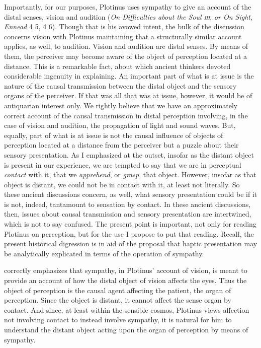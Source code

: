 Importantly, for our purposes, Plotinus uses sympathy to give an account of the distal senses, vision and audition (\emph{On Difficulties about the Soul \textsc{iii}}, \emph{or On Sight}, \emph{Ennead} 4 5, 4 6). Though that is his avowed intent, the bulk of the discussion concerns vision with Plotinus maintaining that a structurally similar account applies, as well, to audition. Vision and audition are distal senses. By means of them, the perceiver may become aware of the object of perception located at a distance. This is a remarkable fact, about which ancient thinkers devoted considerable ingenuity in explaining. An important part of what is at issue is the nature of the causal transmission between the distal object and the sensory organs of the perceiver. If that was all that was at issue, however, it would be of antiquarian interest only. We rightly believe that we have an approximately correct account of the causal transmission in distal perception involving, in the case of vision and audition, the propagation of light and sound waves. But, equally, part of what is at issue is not the causal influence of objects of perception located at a distance from the perceiver but a puzzle about their sensory presentation. As I emphasized at the outset, insofar as the distant object is present in our experience, we are tempted to say that we are in perceptual \emph{contact} with it, that we \emph{apprehend}, or \emph{grasp}, that object. However, insofar as that object is distant, we could not be in contact with it, at least not literally. So these ancient discussions concern, as well, what sensory presentation could be if it is not, indeed, tantamount to sensation by contact. In these ancient discussions, then, issues about causal transmission and sensory presentation are intertwined, which is not to say confused. The present point is important, not only for reading Plotinus on perception, but for the use I propose to put that reading. Recall, the present historical digression is in aid of the proposal that haptic presentation may be analytically explicated in terms of the operation of sympathy.

\citet[chapter 3]{Emilsson:1988uq} correctly emphasizes that sympathy, in Plotinus' account of vision, is meant to provide an account of how the distal object of vision affects the eyes. Thus the object of perception is the causal agent affecting the patient, the organ of perception. Since the object is distant, it cannot affect the sense organ by contact. And since, at least within the sensible cosmos, Plotinus views affection not involving contact to instead involve sympathy, it is natural for him to understand the distant object acting upon the organ of perception by means of sympathy. 

